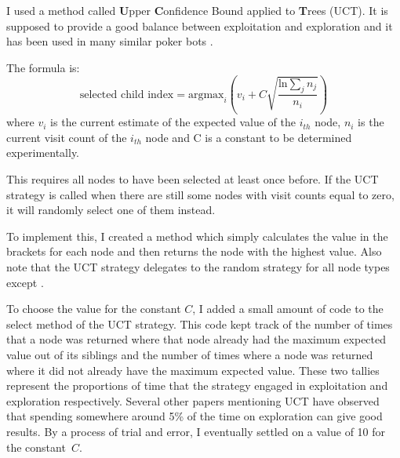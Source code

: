 I used a method called \textbf{U}pper \textbf{C}onfidence Bound applied to \textbf{T}rees (UCT). It is supposed to provide a good balance between exploitation and exploration and it has been used in many similar poker bots \cite{mcts-erd}\cite{mcts-comp}\cite{mcts-iomp}\cite{mcts-omtc}.

The formula is: 
\[ \mbox{selected child index} = \mbox{argmax}_i \left( v_i + C \sqrt{ \frac{\mbox{ln} \sum_j n_j}{n_i} } \right) \]
where \(v_i\) is the current estimate of the expected value of the \(i_{th}\) node, \(n_i\) is the current visit count of the \(i_{th}\) node and C is a constant to be determined experimentally. 

This requires all nodes to have been selected at least once before. If the UCT strategy is called when there are still some nodes with visit counts equal to zero, it will randomly select one of them instead. 

To implement this, I created a method which simply calculates the value in the brackets for each node and then returns the node with the highest value. Also note that the UCT strategy delegates to the random strategy for all node types except \choice.

To choose the value for the constant \(C\), I added a small amount of code to the select method of the UCT strategy. This code kept track of the number of times that a node was returned where that node already had the maximum expected value out of its siblings and the number of times where a node was returned where it did not already have the maximum expected value. These two tallies represent the proportions of time that the strategy engaged in exploitation and exploration respectively. Several other papers mentioning UCT have observed that spending somewhere around 5\% of the time on exploration can give good results. 
By a process of trial and error, I eventually settled on a value of 10 for the constant~\(C\). 





